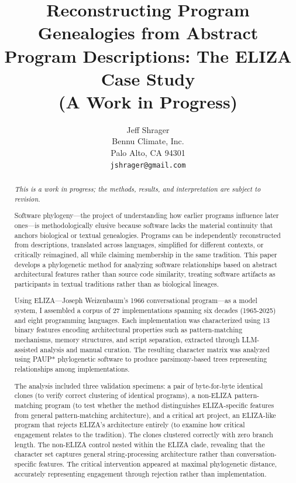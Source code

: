 \documentclass{article}
\title{Reconstructing Program Genealogies from Abstract Program Descriptions: The ELIZA Case Study\\ \large (A Work in Progress)}
\author{
  Jeff Shrager\\
  Bennu Climate, Inc.\\
  Palo Alto, CA 94301\\
  \texttt{jshrager@gmail.com}
}
\begin{document}
\maketitle

\begin{abstract}

\textit{This is a work in progress; the methods, results, and interpretation are subject to revision.}

Software phylogeny—the project of understanding how earlier programs influence later ones—is methodologically elusive because software lacks the material continuity that anchors biological or textual genealogies. Programs can be independently reconstructed from descriptions, translated across languages, simplified for different contexts, or critically reimagined, all while claiming membership in the same tradition. This paper develops a phylogenetic method for analyzing software relationships based on abstract architectural features rather than source code similarity, treating software artifacts as participants in textual traditions rather than as biological lineages.

Using ELIZA—Joseph Weizenbaum's 1966 conversational program—as a model system, I assembled a corpus of 27 implementations spanning six decades (1965-2025) and eight programming languages. Each implementation was characterized using 13 binary features encoding architectural properties such as pattern-matching mechanisms, memory structures, and script separation, extracted through LLM-assisted analysis and manual curation. The resulting character matrix was analyzed using PAUP* phylogenetic software to produce parsimony-based trees representing relationships among implementations.

The analysis included three validation specimens: a pair of byte-for-byte identical clones (to verify correct clustering of identical programs), a non-ELIZA pattern-matching program (to test whether the method distinguishes ELIZA-specific features from general pattern-matching architecture), and a critical art project, an ELIZA-like program that rejects ELIZA's architecture entirely (to examine how critical engagement relates to the tradition). The clones clustered correctly with zero branch length. The non-ELIZA control nested within the ELIZA clade, revealing that the character set captures general string-processing architecture rather than conversation-specific features. The critical intervention appeared at maximal phylogenetic distance, accurately representing engagement through rejection rather than implementation.


\end{abstract}
\end{document}
